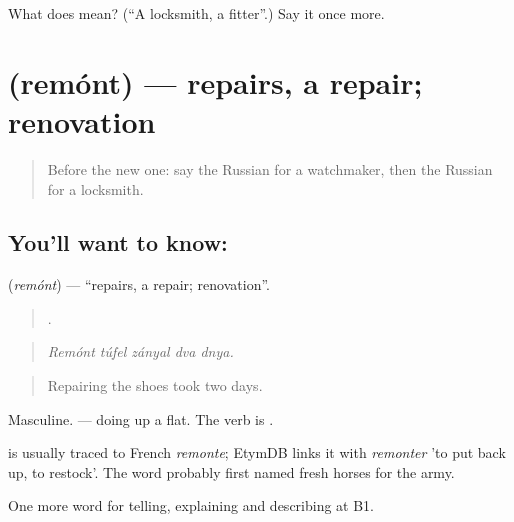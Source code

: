 \begin{tcolorbox}[breakable,colback=teal!4,colframe=teal!35!black,title={Before you move on}]
What does  mean? (\textquotedblleft{}A locksmith, a fitter\textquotedblright{}.) Say it once more.
\end{tcolorbox}
\section[\texorpdfstring{\ru{ремонт} (remónt)}{ремонт (remónt)}]{ (remónt) — repairs, a repair; renovation}

\label{lesson:RU-C447-remont}



\begin{quote}
Before the new one: say the Russian for a watchmaker, then the Russian for a locksmith.
\end{quote}

\subsection*{You'll want to know: }
\textbf{} (\emph{remónt}) — \textquotedblleft{}repairs, a repair; renovation\textquotedblright{}.

\begin{quote}
    .
\end{quote}

\begin{quote}
\emph{Remónt túfel zányal dva dnya.}
\end{quote}

\begin{quote}
Repairing the shoes took two days.
\end{quote}

Masculine. \emph{ } — doing up a flat. The verb is \emph{}.

\begin{cousinweb}
\emph{} is usually traced to French \emph{remonte}; EtymDB links it with \emph{remonter} 'to put back up, to restock'. The word probably first named fresh horses for the army.
\end{cousinweb}

\begin{grammarlens}[title={What you've built}]
One more word for telling, explaining and describing at B1.
\end{grammarlens}

